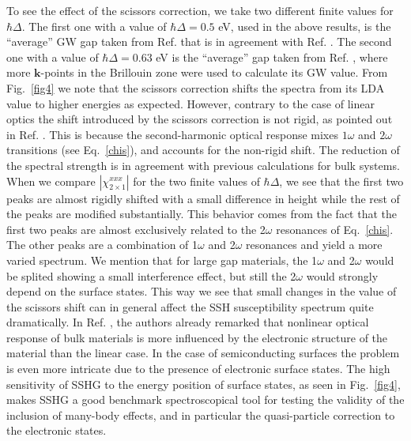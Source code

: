 To see the effect of the scissors correction, we take two different finite
values for $\hbar\Delta$. The first one with a value of $\hbar\Delta=0.5$ eV,
used in the above results, is the ``average'' GW gap taken from
Ref. \cite{rohlfingPRB95} that is in agreement with
Ref. \cite{garciaCPC01}. The second one with a value of $\hbar\Delta=0.63$
eV is the ``average'' gap taken from Ref. \cite{asahiPRB00}, where more
$\mathbf{k}$-points in the Brillouin zone were used to calculate its GW value.
From Fig.~\ref{fig4} we note that the scissors correction shifts the spectra
from its LDA value to higher energies as expected. However, contrary to the case
of linear optics\cite{cabellosPRB09} the shift introduced by the scissors
correction is not rigid, as pointed out in Ref. \cite{nastosPRB05}. This
is because the second-harmonic optical response mixes $1\omega$ and $2\omega$
transitions (see Eq.~\eqref{chis}), and accounts for the non-rigid shift. The
reduction of the spectral strength is in agreement with previous calculations
for bulk systems.\cite{nastosPRB05, luppiPRB10, leitsmannPRB05} When we compare
$|\chi^{xxx}_{2\times 1}|$ for the two finite values of $\hbar\Delta$, we see
that the first two peaks are almost rigidly shifted with a small difference in
height while the rest of the peaks are modified substantially. This behavior
comes from the fact that the first two peaks are almost exclusively related to
the 2$\omega$ resonances of Eq.~\eqref{chis}. The other peaks are a combination
of 1$\omega$ and 2$\omega$ resonances and yield a more varied spectrum. We
mention that for large gap materials, the 1$\omega$ and 2$\omega$ would be
splited showing a small interference effect, but still the 2$\omega$ would
strongly depend on the surface states. This way we see that small changes in the
value of the scissors shift can in general affect the SSH susceptibility
spectrum quite dramatically. In Ref. \cite{adolphPRB00}, the authors
already remarked that nonlinear optical response of bulk materials is more
influenced by the electronic structure of the material than the linear case. In
the case of semiconducting surfaces the problem is even more intricate due to
the presence of electronic surface states. The high sensitivity of SSHG to the
energy position  of surface states, as seen in Fig.~\ref{fig4}, makes SSHG a
good benchmark spectroscopical tool for testing the validity of the inclusion of
many-body effects, and in particular the quasi-particle correction to the
electronic states.

